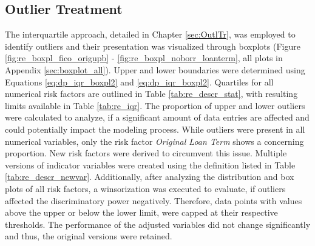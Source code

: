 \subsection{Outlier Treatment}
The interquartile approach, detailed in Chapter \ref{sec:OutlTr}, was employed to identify outliers and their presentation was visualized through boxplots (Figure \ref{fig:re_boxpl_fico_origupb} - \ref{fig:re_boxpl_noborr_loanterm}, all plots in Appendix \ref{sec:boxplot_all}). Upper and lower boundaries were determined using Equations \ref{eq:dp_iqr_boxpl2} and \ref{eq:dp_iqr_boxpl2}. Quartiles for all numerical risk factors are outlined in Table \ref{tab:re_descr_stat}, with resulting limits available in Table \ref{tab:re_iqr}. The proportion of upper and lower outliers were calculated to analyze, if a significant amount of data entries are affected and could potentially impact the modeling process. While outliers were present in all numerical variables, only the risk factor \emph{Original Loan Term} shows a concerning proportion. New risk factors were derived to circumvent this issue. Multiple versions of indicator variables were created using the definition listed in Table \ref{tab:re_descr_newvar}. Additionally, after analyzing the distribution and box plots of all risk factors, a winsorization was executed to evaluate, if outliers affected the discriminatory power negatively. Therefore, data points with values above the upper or below the lower limit, were capped at their respective thresholds. The performance of the adjusted variables did not change significantly and thus, the original versions were retained.

